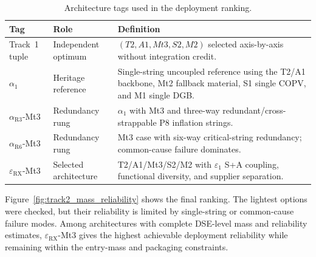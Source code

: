 \begin{table}[H]
\centering
\small
\renewcommand{\arraystretch}{1}
\caption{Architecture tags used in the deployment ranking.}
\label{tab:architecture-tag-definitions}
\begin{tabularx}{\textwidth}{@{}p{} p{} X@{}}
\toprule
\textbf{Tag} & \textbf{Role} & \textbf{Definition} \\
\midrule
Track~1 tuple & Independent optimum & $(T2,A1,Mt3,S2,M2)$ selected axis-by-axis without integration credit. \\
$\alpha_1$ & Heritage reference & Single-string uncoupled reference using the T2/A1 backbone, Mt2 fallback material, S1 single COPV, and M1 single DGB. \\
$\alpha_{\mathrm{R3}}$-Mt3 & Redundancy rung & $\alpha_1$ with Mt3 and three-way redundant/cross-strappable P8 inflation strings. \\
$\alpha_{\mathrm{R6}}$-Mt3 & Redundancy rung & Mt3 case with six-way critical-string redundancy; common-cause failure dominates. \\
$\varepsilon_{\mathrm{RX}}$-Mt3 & Selected architecture & T2/A1/Mt3/S2/M2 with $\varepsilon_1$ S+A coupling, functional diversity, and supplier separation. \\
\bottomrule
\end{tabularx}
\end{table}

Figure~\ref{fig:track2_mass_reliability} shows the final ranking. The lightest options were checked, but their reliability is limited by single-string or common-cause failure modes. Among architectures with complete DSE-level mass and reliability estimates, $\varepsilon_{\mathrm{RX}}$-Mt3 gives the highest achievable deployment reliability while remaining within the entry-mass and packaging constraints.

